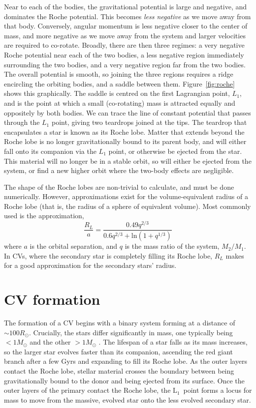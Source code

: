 Near to each of the bodies, the gravitational potential is large and negative, and dominates the Roche potential. This becomes \textit{less negative} as we move away from that body. Conversely, angular momentum is less negative closer to the center of mass, and more negative as we move away from the system and larger velocities are required to co-rotate. Broadly, there are then three regimes: a very negative Roche potential near each of the two bodies, a less negative region immediately surrounding the two bodies, and a very negative region far from the two bodies. The overall potential is smooth, so joining the three regions requires a ridge encircling the orbiting bodies, and a saddle between them. Figure~\ref{fig:roche} shows this graphically. The saddle is centred on the first Lagrangian point, $L_1$, and is the point at which a small (co-rotating) mass is attracted equally and oppositely by both bodies. We can trace the line of constant potential that passes through the $L_1$ point, giving two teardrops joined at the tips. The teardrop that encapsulates a star is known as its Roche lobe. Matter that extends beyond the Roche lobe is no longer gravitationally bound to its parent body, and will either fall onto its companion via the $L_1$ point, or otherwise be ejected from the star. This material will no longer be in a stable orbit, so will either be ejected from the system, or find a new higher orbit where the two-body effects are negligible.

The shape of the Roche lobes are non-trivial to calculate, and must be done numerically. However, approximations exist for the volume-equivalent radius of a Roche lobe (that is, the radius of a sphere of equivalent volume). Most commonly used is the \citet{Eggleton1983} approximation,
\begin{equation}
    \label{eqn:eggleton approximation}
    \frac{R_L}{a} = \frac{0.49 q^{2/3}}{0.6 q^{2/3} + \mathrm{ln}(1 + q^{1/3})}
\end{equation}
where $a$ is the orbital separation, and $q$ is the mass ratio of the system, $M_2 / M_1$. In CVs, where the secondary star is completely filling its Roche lobe, $R_L$ makes for a good approximation for the secondary stars' radius.

\section{CV formation}
\label{sect:introduction:formation of CVs}

The formation of a CV begins with a binary system forming at a distance of $\sim 100{R_\odot}$. Crucially, the stars differ significantly in mass, one typically being $<1{M_\odot}$ and the other $>1{M_\odot}$ \citep{Ritter2012}. The lifespan of a star falls as its mass increases, so the larger star evolves faster than its companion, ascending the red giant branch after a few Gyrs and expanding to fill its Roche lobe. 
As the outer layers contact the Roche lobe, stellar material crosses the boundary between being gravitationally bound to the donor and being ejected from its surface. 
Once the outer layers of the primary contact the Roche lobe, the $\mathrm L_1$\ point forms a locus for mass to move from the massive, evolved star onto the less evolved secondary star.

